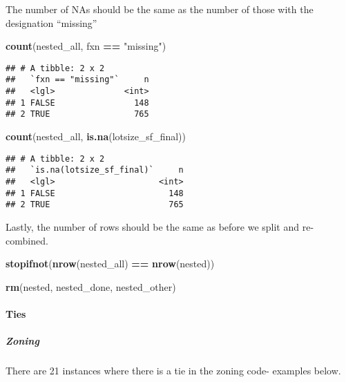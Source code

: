 \documentclass[]{article}
\newenvironment{Shaded}{\begin{snugshade}}{\end{snugshade}}
\newcommand{\KeywordTok}[1]{\textcolor[rgb]{0.13,0.29,0.53}{\textbf{#1}}}
\newcommand{\StringTok}[1]{\textcolor[rgb]{0.31,0.60,0.02}{#1}}
\newcommand{\OperatorTok}[1]{\textcolor[rgb]{0.81,0.36,0.00}{\textbf{#1}}}
\newcommand{\NormalTok}[1]{#1}
\let\oldparagraph\paragraph
\renewcommand{\paragraph}[1]{\oldparagraph{#1}\mbox{}}
\let\oldsubparagraph\subparagraph
\renewcommand{\subparagraph}[1]{\oldsubparagraph{#1}\mbox{}}
\begin{document}
The number of NAs should be the same as the number of those with the
designation ``missing''

\begin{Shaded}
\begin{Highlighting}[]
\KeywordTok{count}\NormalTok{(nested_all, fxn }\OperatorTok{==}\StringTok{ "missing"}\NormalTok{)}
\end{Highlighting}
\end{Shaded}

\begin{verbatim}
## # A tibble: 2 x 2
##   `fxn == "missing"`     n
##   <lgl>              <int>
## 1 FALSE                148
## 2 TRUE                 765
\end{verbatim}

\begin{Shaded}
\begin{Highlighting}[]
\KeywordTok{count}\NormalTok{(nested_all, }\KeywordTok{is.na}\NormalTok{(lotsize_sf_final))}
\end{Highlighting}
\end{Shaded}

\begin{verbatim}
## # A tibble: 2 x 2
##   `is.na(lotsize_sf_final)`     n
##   <lgl>                     <int>
## 1 FALSE                       148
## 2 TRUE                        765
\end{verbatim}

Lastly, the number of rows should be the same as before we split and
re-combined.

\begin{Shaded}
\begin{Highlighting}[]
\KeywordTok{stopifnot}\NormalTok{(}\KeywordTok{nrow}\NormalTok{(nested_all) }\OperatorTok{==}\StringTok{ }\KeywordTok{nrow}\NormalTok{(nested))}

\KeywordTok{rm}\NormalTok{(nested, nested_done, nested_other)}
\end{Highlighting}
\end{Shaded}

\paragraph{Ties}\label{ties}

\subparagraph{Zoning}\label{zoning}

There are 21 instances where there is a tie in the zoning code- examples
below.
\end{document}
